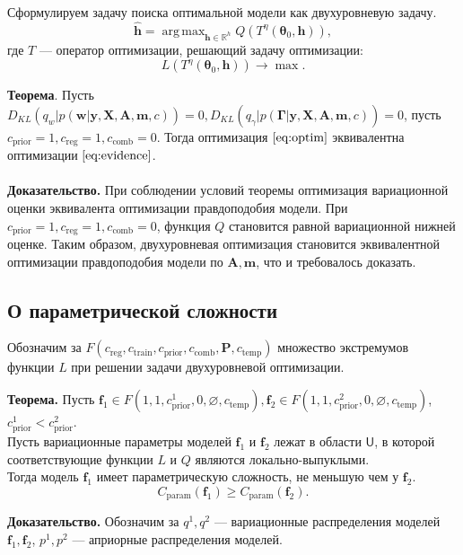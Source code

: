 \documentclass[12pt]{article}
\DeclareMathOperator*{\argmax}{arg\,max}
\begin{document}
Сформулируем задачу поиска оптимальной модели как двухуровневую задачу.
\begin{equation}
\label{eq:optim}
	\hat{\mathbf{h}} = \argmax_{\mathbf{h} \in \mathbb{R}^h} Q( T^\eta(\boldsymbol{\theta}_0, \mathbf{h})),
\end{equation}
где $T$ --- оператор оптимизации, решающий задачу оптимизации:
\[
    L(T^\eta(\boldsymbol{\theta}_0, \mathbf{h})) \to \max.
\]


\textbf{Теорема}. Пусть $D_{KL}(q_w|p(\mathbf{w}|\mathbf{y}, \mathbf{X}, \mathbf{A},\mathbf{m}, c)) = 0, D_{KL}(q_\gamma|p(\boldsymbol{\Gamma}|\mathbf{y}, \mathbf{X}, \mathbf{A},\mathbf{m}, c)) = 0$, пусть $c_{\text{prior}} = 1, c_{\text{reg}} = 1, c_{\text{comb}} = 0$. Тогда оптимизация $\eqref{eq:optim}$ эквивалентна оптимизации $\eqref{eq:evidence}$.\\~\\
\textbf{Доказательство.} При соблюдении условий теоремы оптимизация вариационной оценки эквивалента оптимизации правдоподобия модели.
При $c_{\text{prior}} = 1, c_{\text{reg}} = 1, c_{\text{comb}} = 0$, функция $Q$ становится равной вариационной нижней оценке. 
Таким образом, двухуровневая оптимизация становится эквивалентной оптимизации правдоподобия модели по $\mathbf{A},\mathbf{m}$, что и требовалось доказать.


\subsection{О параметрической сложности}
Обозначим за $F(c_{\text{reg}}, c_{\text{train}}, c_{\text{prior}}, c_{\text{comb}}, \mathbf{P}, c_{\text{temp}})$ множество экстремумов функции $L$ при решении задачи двухуровневой оптимизации.


\textbf{Теорема.}  
Пусть $\mathbf{f}_1 \in F(1, 1, c_{\text{prior}}^1, 0, \varnothing,  c_{\text{temp}} ), \mathbf{f}_2 \in F(1, 1, c_{\text{prior}}^2, 0, \varnothing,  c_{\text{temp}})$, $c_{\text{prior}}^1 < c_{\text{prior}}^2$.\\
Пусть вариационные параметры моделей $\mathbf{f}_1$ и $\mathbf{f}_2$ лежат в области $\mathsf{U}$, в которой соответствующие функции $L$ и $Q$ являются локально-выпуклыми.\\ 
Тогда модель $\mathbf{f}_1$ имеет параметрическую сложность, не меньшую чем у $\mathbf{f}_2$.
\[
    C_\text{param}(\mathbf{f}_1) \geq C_\text{param}(\mathbf{f}_2).
\]

\textbf{Доказательство.}
Обозначим за $q^1, q^2$ --- вариационные распределения моделей $\mathbf{f}_1, \mathbf{f}_2$, 
$p^1, p^2$ --- априорные распределения моделей.
 
\end{document}
